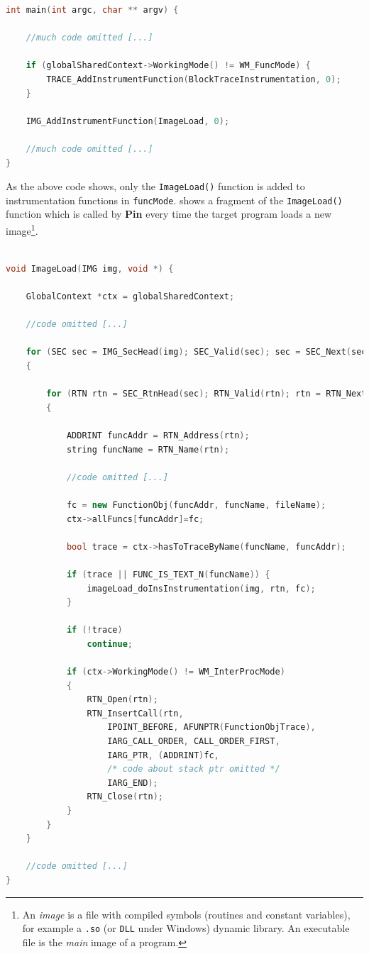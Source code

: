 \documentclass[a4paper,10pt]{report}
\begin{document}
\begin{lstlisting}[language=C++, 
	caption={a fragment of main() routine}, 
	label=main1, frame=leftline]	
int main(int argc, char ** argv) {

	//much code omitted [...]

	if (globalSharedContext->WorkingMode() != WM_FuncMode) {
		TRACE_AddInstrumentFunction(BlockTraceInstrumentation, 0);
	}

	IMG_AddInstrumentFunction(ImageLoad, 0);

	//much code omitted [...]
}

\end{lstlisting}

As the above code shows, only the \verb|ImageLoad()| function is added to instrumentation
functions in \verb|funcMode|.
 shows a fragment of the \verb|ImageLoad()| function which
is called by \textbf{Pin} every time the target program loads a new 
image\footnote{An \emph{image} is a file with compiled symbols (routines and constant variables), for example a \texttt{.so} (or \texttt{DLL} under Windows) dynamic library.
An executable file is the \emph{main} image of a program.}.

\begin{lstlisting}[language=C++, 
	caption={a fragment of ImageLoad() routine}, 
	label=imgload, frame=leftline]	

void ImageLoad(IMG img, void *) {

	GlobalContext *ctx = globalSharedContext;
	
	//code omitted [...]

	for (SEC sec = IMG_SecHead(img); SEC_Valid(sec); sec = SEC_Next(sec)) 
	{

		for (RTN rtn = SEC_RtnHead(sec); RTN_Valid(rtn); rtn = RTN_Next(rtn)) 
		{
		
			ADDRINT funcAddr = RTN_Address(rtn);
			string funcName = RTN_Name(rtn);

			//code omitted [...]

			fc = new FunctionObj(funcAddr, funcName, fileName);
			ctx->allFuncs[funcAddr]=fc;		

			bool trace = ctx->hasToTraceByName(funcName, funcAddr);

			if (trace || FUNC_IS_TEXT_N(funcName)) {
				imageLoad_doInsInstrumentation(img, rtn, fc);
			}

			if (!trace)
				continue;

			if (ctx->WorkingMode() != WM_InterProcMode)
			{	
				RTN_Open(rtn);
				RTN_InsertCall(rtn, 
					IPOINT_BEFORE, AFUNPTR(FunctionObjTrace), 
					IARG_CALL_ORDER, CALL_ORDER_FIRST, 
					IARG_PTR, (ADDRINT)fc,  
					/* code about stack ptr omitted */
					IARG_END);
				RTN_Close(rtn);
			}			
		}
	}

	//code omitted [...]
}

\end{lstlisting}
\end{document}
